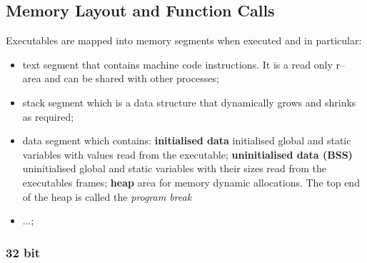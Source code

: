 \subsection{Memory Layout and Function Calls}
Executables are mapped into memory segments when executed and in particular:
\begin{itemize}
    \item {\ttfamily text} segment that contains machine code instructions. It is a read only {\ttfamily r--} area and
        can be shared with other processes;
    \item {\ttfamily stack} segment which is a data structure that dynamically grows and shrinks as required;
    \item {\ttfamily data} segment which contains:
        \subitem \textbf{initialised data} initialised global and static variables with values read from the executable;
        \subitem \textbf{uninitialised data (BSS)} uninitialised global and static variables with their sizes read from
        the executables frames;
        \subitem \textbf{heap} area for memory dynamic allocations. The top end of the heap is called the
        \textit{program break}
    \item ...;
\end{itemize}
\subsubsection{32 bit}
